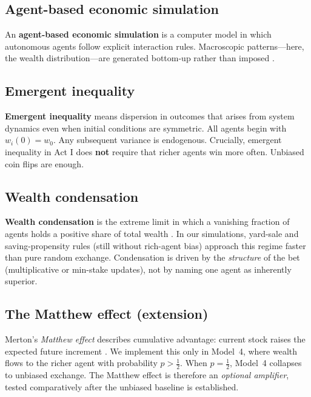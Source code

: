 \documentclass[12pt,a4paper]{article}
\begin{document}
\subsection{Agent-based economic simulation}

An \textbf{agent-based economic simulation} is a computer model in which autonomous agents follow explicit interaction rules.
Macroscopic patterns---here, the wealth distribution---are generated bottom-up rather than imposed \citep{epstein2006, farmer2013}.

\subsection{Emergent inequality}

\textbf{Emergent inequality} means dispersion in outcomes that arises from system dynamics even when initial conditions are symmetric.
All agents begin with $w_i(0) = w_0$.
Any subsequent variance is endogenous.
Crucially, emergent inequality in Act I does \textbf{not} require that richer agents win more often.
Unbiased coin flips are enough.

\subsection{Wealth condensation}

\textbf{Wealth condensation} is the extreme limit in which a vanishing fraction of agents holds a positive share of total wealth \citep{bouchaud2000, ispolatov1998}.
In our simulations, yard-sale and saving-propensity rules (still without rich-agent bias) approach this regime faster than pure random exchange.
Condensation is driven by the \emph{structure} of the bet (multiplicative or min-stake updates), not by naming one agent as inherently superior.

\subsection{The Matthew effect (extension)}

Merton's \emph{Matthew effect} describes cumulative advantage: current stock raises the expected future increment \citep{merton1968, price1976}.
We implement this only in Model~4, where wealth flows to the richer agent with probability $p > \tfrac{1}{2}$.
When $p = \tfrac{1}{2}$, Model~4 collapses to unbiased exchange.
The Matthew effect is therefore an \emph{optional amplifier}, tested comparatively after the unbiased baseline is established.
\end{document}
